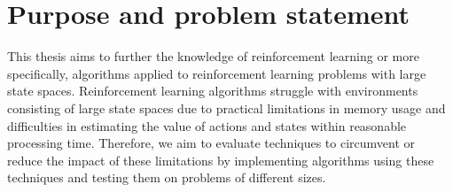 \section{Purpose and problem statement}

This thesis aims to further the knowledge of reinforcement learning or more specifically, algorithms applied to reinforcement learning problems with large state spaces. Reinforcement learning algorithms struggle with environments consisting of large state spaces due to practical limitations in memory usage and difficulties in estimating the value of actions and states within reasonable processing time. Therefore, we aim to evaluate techniques to circumvent or reduce the impact of these limitations by implementing algorithms using these techniques and testing them on problems of different sizes.

